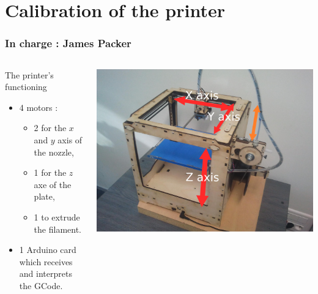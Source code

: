 \documentclass{beamer}
\begin{document}
\section{Calibration of the printer}
\begin{frame}
	\frametitle{In charge : James Packer}
    
    \begin{columns}[t]
  	\begin{column}{5cm}
    \begin{block}{The printer's functioning}
	\begin{itemize}
	\item 4 motors : 
		\begin{itemize}
		\item 2 for the $x$ and $y$ axis of the nozzle,
		\item 1 for the $z$ axe of the plate,
		\item 1 to extrude the filament.
		\end{itemize}
	\item 1 Arduino card which receives and interprets the GCode.
	\end{itemize}	
    \end{block}
    \end{column}

    \begin{column}{6cm}
        \begin{center}
		\includegraphics[width=.8\textwidth]{Ultimaker2}	
		\end{center}
    \end{column}

    \end{columns}
    
\end{frame}
\end{document}
